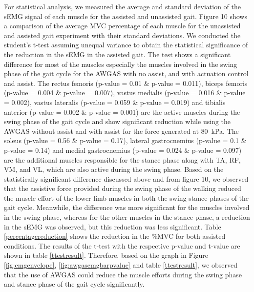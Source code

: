 \documentclass[paper,JRM,paper]{jaciiiarticle}
\begin{document}
For statistical analysis, we measured the average and standard deviation of the sEMG signal of each muscle for the assisted and unassisted gait. Figure 10 shows a comparison of the average MVC percentage of each muscle for the unassisted and assisted gait experiment with their standard deviations. We conducted the student’s t-test assuming unequal variance to obtain the statistical significance of the reduction in the sEMG in the assisted gait. The test shows a significant difference for most of the muscles especially the muscles involved in the swing phase of the gait cycle for the AWGAS with no assist, and with actuation control and assist. The rectus femoris (p-value = 0.01 \& p-value = 0.011), biceps femoris (p-value = 0.004 \& p-value = 0.007), vastus medialis (p-value = 0.016 \& p-value = 0.002), vastus lateralis (p-value = 0.059 \& p-value = 0.019) and tibialis anterior  (p-value = 0.002 \& p-value = 0.001) are the active muscles during the swing phase of the gait cycle and show significant reduction while using the AWGAS without assist and with assist for the force generated at \SI{80}{\kilo\pascal}. The soleus (p-value = 0.56 \& p-value = 0.17), lateral gastrocnemius (p-value = 0.1 \& p-value = 0.14) and medial gastrocnemius (p-value = 0.024 \& p-value = 0.097) are the additional muscles responsible for the stance phase along with TA, RF, VM, and VL, which are also active during the swing phase. Based on the statistically significant difference discussed above and from figure 10, we observed that the assistive force provided during the swing phase of the walking reduced the muscle effort of the lower limb muscles in both the swing stance phases of the gait cycle. Meanwhile, the difference was more significant for the muscles involved in the swing phase, whereas for the other muscles in the stance phase, a reduction in the sEMG was observed, but this reduction was less significant. Table \ref{percentagereduction} shows the reduction in the \%MVC for both assisted conditions. The results of the t-test with the respective p-value and t-value are shown in table \ref{ttestresult}. Therefore, based on the graph in Figure \ref{fig:emgenvelope}, \ref{fig:awgasemgbarpvalue} and table \ref{ttestresult}, we observed that the use of AWGAS could reduce the muscle efforts during the swing phase and stance phase of the gait cycle significantly.
\end{document}
